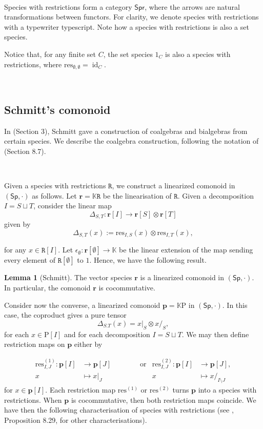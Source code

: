\documentclass[12pt, reqno]{amsart}
\theoremstyle{definition}
\newtheorem{lm}[thm]{Lemma}
\DeclareMathOperator{\id}{id}
\newcommand{\Ss}{\mathsf{Sp}} %
\newcommand{\Spr}{\mathsf{Spr}} %
\newcommand{\rP}{\mathrm{P}}
\newcommand{\prR}{\mathtt{R}}
\newcommand{\tp}{\mathbf{p}}
\newcommand{\trr}{\mathbf{r}}
\begin{document}

\

Species with restrictions form a category $\Spr$, where the arrows are natural transformations between functors.
For clarity, we denote species with restrictions with a typewriter typescript.
Note how a species with restrictions is also a set species.

Notice that, for any finite set $C$, the set species $\mathrm{1}_C$ is also a species with restrictions, where $\text{res}_{\emptyset, \emptyset} = \id_C$.

\

\subsection{Schmitt's comonoid}
In \cite{Schmitt1993} (Section 3), Schmitt gave a construction of coalgebras and bialgebras from certain species. We describe the coalgebra construction, following the notation of \cite{AM2010} (Section 8.7).

\

Given a species with restrictions $\prR$, we construct a linearized comonoid in $(\Ss, \cdot)$ as follows. Let $\trr=\mathbb{K}\prR$ be the linearisation of $\prR$. Given a decomposition $I=S \sqcup T$, consider the linear map
\[
\Delta_{S,T}: \trr[I]\to \trr[S] \otimes \trr[T]
\]
given by
\begin{equation}\label{CoprodRestr}
\Delta_{S,T}(x):=\text{res}_{I,S}(x)\otimes \text{res}_{I,T}(x),
\end{equation}

for any $x \in \prR[I]$. Let $\epsilon_\emptyset: \trr[\emptyset]\to \mathbb{K}$ be the linear extension of the map sending every element of $\prR[\emptyset]$ to $1$. Hence, we have the following result.

\begin{lm}[Schmitt]
The vector species $\trr$ is a linearized comonoid in $(\Ss, \cdot)$. In particular, the comonoid $\trr$ is cocommutative.
\end{lm}


Consider now the converse, a linearized comonoid $\tp=\mathbb{K}\rP$ in $(\Ss, \cdot)$. 
In this case, the coproduct gives a pure tensor
\[\Delta_{S.T}(x)=x|_S \otimes x/_S,\]
for each $x \in \rP[I]$ and for each decomposition $I = S \sqcup T$. We may then define restriction maps on $\tp$ either by

\begin{align*}
\text{res}^{(1)}_{I,J}: \tp[I] &\to \tp[J] \qquad \qquad  \text{or}  &\text{res}^{(2)}_{I,J}: \tp[I] &\to \tp[J],\\
x&\mapsto x|_J \qquad &x&\mapsto x/_{I\setminus J}
\end{align*} 
for $x \in \tp[I]$. Each restriction map $\text{res}^{(1)}$ or $\text{res}^{(2)}$ turns $\tp$ into a species with restrictions. When $\tp$ is cocommutative, then both restriction maps coincide. We have then the following characterisation of species with restrictions (see \cite{AM2010}, Proposition 8.29, for other characterisations).
\end{document}

